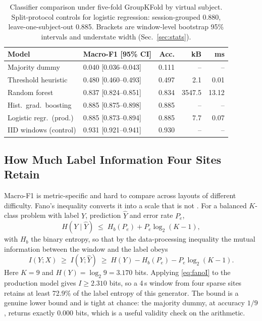 \documentclass[10pt,conference,a4paper]{IEEEtran}
\begin{document}
\begin{table}[!t]
\caption{Classifier comparison under five-fold GroupKFold by virtual subject.
Split-protocol controls for logistic regression: session-grouped 0.880,
leave-one-subject-out 0.885. Brackets are window-level bootstrap 95\%
intervals and understate width (Sec.~\ref{sec:stats}).}
\label{tab:models}
\centering
\renewcommand{\arraystretch}{1.1}
\setlength{\tabcolsep}{3pt}
\scriptsize
\begin{tabular}{@{}llrrr@{}}
\toprule
Model & Macro-F1 [95\% CI] & Acc. & kB & ms \\
\midrule
Majority dummy           & 0.040 [0.036--0.043] & 0.111 & --     & --    \\
Threshold heuristic      & 0.480 [0.460--0.493] & 0.497 & 2.1    & 0.01  \\
Random forest            & 0.837 [0.824--0.851] & 0.834 & 3547.5 & 13.12 \\
Hist.\ grad.\ boosting   & 0.885 [0.875--0.898] & 0.885 & --     & --    \\
Logistic regr.\ (prod.)  & 0.885 [0.873--0.894] & 0.885 & 7.7    & 0.07  \\
IID windows (control)    & 0.931 [0.921--0.941] & 0.930 & --     & --    \\
\bottomrule
\end{tabular}
\end{table}

\subsection{How Much Label Information Four Sites Retain}
\label{sec:fano}

Macro-F1 is metric-specific and hard to compare across layouts of different
difficulty. Fano's inequality converts it into a scale that is not
\cite{cover2006}. For a balanced $K$-class problem with label $Y$, prediction
$\hat Y$ and error rate $P_e$,
\begin{equation}
H(Y\mid\hat Y)\;\le\;H_b(P_e)+P_e\log_2(K-1),
\label{eq:fano}
\end{equation}
with $H_b$ the binary entropy, so that by the data-processing inequality the
mutual information between the window and the label obeys
\begin{equation}
I(Y;X)\;\ge\;I(Y;\hat Y)\;\ge\;H(Y)-H_b(P_e)-P_e\log_2(K-1).
\label{eq:fanoI}
\end{equation}
Here $K=9$ and $H(Y)=\log_2 9 = 3.170$ bits. Applying \eqref{eq:fanoI} to the
production model gives $I\ge 2.310$ bits, so a 4\,s window from four sparse
sites retains at least 72.9\% of the label entropy of this generator. The bound
is a genuine lower bound and is tight at chance: the majority dummy, at
accuracy $1/9$, returns exactly 0.000 bits, which is a useful validity check on
the arithmetic.
\end{document}

